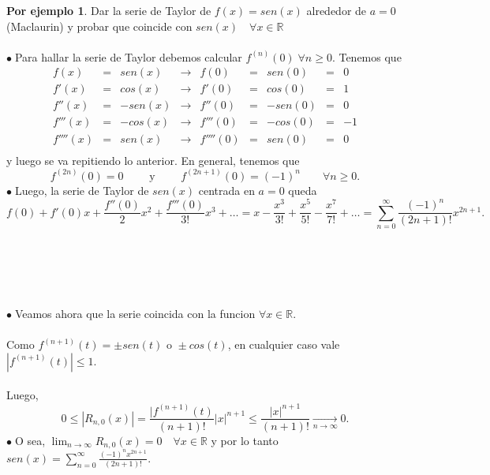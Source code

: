 \documentclass{article}
\theoremstyle{definition}
\newtheorem*{ej}{Por ejemplo}
\theoremstyle{remark}
\newcommand\bl{$\bullet\;$}
\begin{document}
\begin{ej}
  Dar la serie de Taylor de $f(x)=sen(x)$ alrededor de $a=0$ (Maclaurin) y probar que coincide con $sen(x)\quad \forall x \in \mathbb{R}$ \\\\
  \bl Para hallar la serie de Taylor debemos calcular $f^{(n)}(0) \; \forall n \geq 0$. Tenemos que \\ $$\begin{array}{rlrlrlrlr}
    f(x) & = & sen(x) & \longrightarrow & f(0) & = & sen(0) & = & 0 \\
    f'(x) & = & cos(x) & \longrightarrow & f'(0) & = & cos(0)& = & 1 \\
    f''(x) & = & -sen(x) & \longrightarrow & f''(0) & = & -sen(0)& = & 0 \\
    f'''(x) & = & -cos(x) & \longrightarrow & f'''(0) & = & -cos(0)& = & -1 \\
    f''''(x) & = & sen(x) & \longrightarrow & f''''(0) & = & sen(0)& = & 0 \\
  \end{array}$$ 
  y luego se va repitiendo lo anterior. En general, tenemos que \[ 
    f^{(2n)}(0)=0\quad \quad \text{ y } \quad \quad f^{(2n+1)}(0)=(-1)^n \quad \quad \forall n \geq 0.
    \] \bl Luego, la serie de Taylor de $sen(x)$ centrada en $a=0$ queda \[
    f(0)+f'(0)x+\frac{f''(0)}{2}x^2+\frac{f'''(0)}{3!}x^3 + \dots = x- \frac{x^3}{3!}+\frac{x^5}{5!}-\frac{x^7}{7!}+\dots=\sum_{n=0}^{\infty}{\frac{(-1)^n}{(2n+1)!}x^{2n+1}}.
  \] \\\\\\\\\\
  \bl Veamos ahora que la serie coincida con la funcion $\forall x \in \mathbb{R}$. \\\\
Como $f^{(n+1)}{(t)}=\pm sen(t) \text { o } \pm cos(t)$, en cualquier caso vale $|f^{(n+1)}{(t)}| \leq 1$. \\ \\
  Luego, \[ 
  0 \leq |R_{n,0}(x)|=\frac{|f^{(n+1)}(t)}{(n+1)!}|x|^{n+1}\leq \frac{|x|^{n+1}}{(n+1)!} \underset{n\to\infty}{\longrightarrow} 0. 
\]
\bl O sea, $\lim_{n\to\infty}{R_{n,0}(x)}=0 \quad \forall x \in \mathbb{R}$ y por lo tanto $sen(x)=\sum_{n=0}^{\infty}{\frac{(-1)^{n}x^{2n+1}}{(2n+1)!}}$. 
\end{ej}
\end{document}
